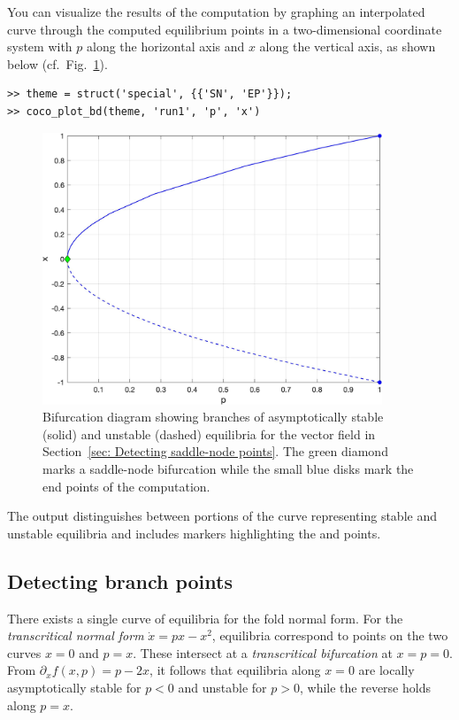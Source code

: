 You can visualize the results of the computation by graphing an interpolated curve through the computed equilibrium points in a two-dimensional coordinate system with $p$ along the horizontal axis and $x$ along the vertical axis, as shown below (cf.\ Fig.~\ref{fig: Section3_1_1}).
\begin{lstlisting}[language=coco-highlight,frame=lines]
>> theme = struct('special', {{'SN', 'EP'}});
>> coco_plot_bd(theme, 'run1', 'p', 'x')
\end{lstlisting}
\begin{figure}[h]
\centering
\includegraphics[width=4in]{Figures/Section3_1_1.jpg}
\caption{Bifurcation diagram showing branches of asymptotically stable (solid) and unstable (dashed) equilibria for the vector field in Section~\ref{sec: Detecting saddle-node points}. The green diamond marks a saddle-node bifurcation while the small blue disks mark the end points of the computation.}
\label{fig: Section3_1_1}
\end{figure}
The output distinguishes between portions of the curve representing stable and unstable equilibria and includes markers highlighting the  and  points.

\subsection{Detecting branch points}
\label{sec: Detecting branch points}
There exists a single curve of equilibria for the fold normal form. For the \textit{transcritical normal form} $\dot{x}=px-x^2$, equilibria correspond to points on the two curves $x=0$ and $p=x$. These intersect at a \textit{transcritical bifurcation} at $x=p=0$. From $\partial_xf(x,p)=p-2x$, it follows that equilibria along $x=0$ are locally asymptotically stable for $p<0$ and unstable for $p>0$, while the reverse holds along $p=x$.

